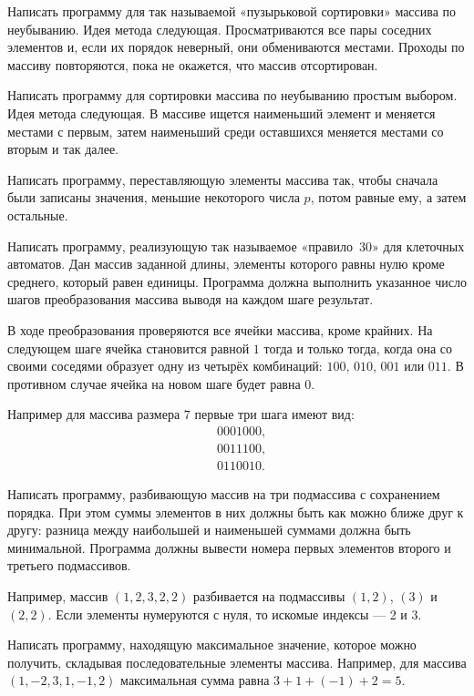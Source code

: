 \task Написать программу для так называемой «пузырьковой сортировки»
массива по неубыванию. Идея метода
следующая. Просматриваются все пары соседних элементов и, если их
порядок неверный, они обмениваются местами. Проходы по массиву
повторяются, пока не окажется, что массив отсортирован.

\task Написать программу для сортировки массива по неубыванию простым
выбором. Идея метода следующая. В
массиве ищется наименьший элемент и меняется местами с первым, затем
наименьший среди оставшихся меняется местами со вторым и так далее.

\task Написать программу, переставляющую элементы массива так, чтобы
сначала были записаны значения, меньшие некоторого числа $p$, потом
равные ему, а затем остальные.

\task Написать программу, реализующую так называемое «правило~30» для
клеточных автоматов. Дан массив заданной
длины, элементы которого равны нулю кроме среднего, который равен
единицы. Программа должна выполнить указанное число шагов
преобразования массива выводя на каждом шаге результат.

В ходе преобразования проверяются все ячейки массива, кроме
крайних. На следующем шаге ячейка становится равной $1$ тогда и только
тогда, когда она со своими соседями образует одну из четырёх
комбинаций: $100$, $010$, $001$ или $011$. В противном случае ячейка
на новом шаге будет равна $0$.

Например для массива размера $7$ первые три шага имеют вид:
\begin{eqnarray*}
&0001000,\\
&0011100,\\
&0110010.
\end{eqnarray*}

\task Написать программу, разбивающую массив на три подмассива с
сохранением порядка. При этом суммы элементов в них должны быть как
можно ближе друг к другу: разница между наибольшей и наименьшей
суммами должна быть минимальной. Программа должны вывести номера
первых элементов второго и третьего подмассивов.

Например, массив $(1, 2, 3, 2, 2)$ разбивается на подмассивы $(1, 2)$,
$(3)$ и $(2, 2).$ Если элементы нумеруются с нуля, то искомые индексы
— 2 и 3.

\task Написать программу, находящую максимальное значение, которое
можно получить, складывая последовательные элементы массива. Например,
для массива $(1, -2, 3, 1, -1, 2)$ максимальная сумма равна
$3+1+(-1)+2=5$.

